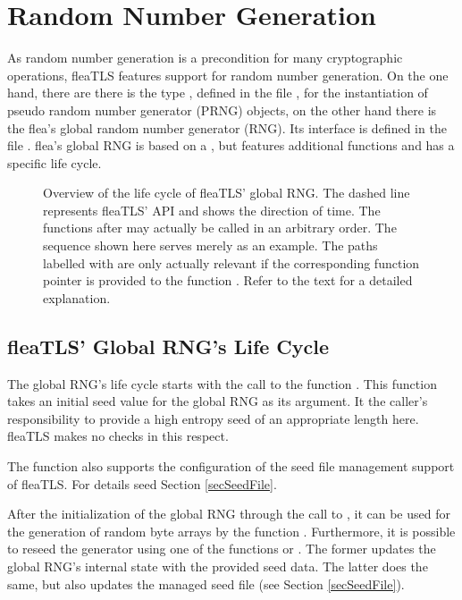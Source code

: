 \documentclass[a4paper,11pt]{scrartcl}
\begin{document}
\section{Random Number Generation }
\label{secRng}

As random number generation is a precondition for many cryptographic operations,
fleaTLS features support for random number generation. On the one hand, there
are there is the type , defined in the file
, for the instantiation of
pseudo random number generator (PRNG) objects, on the other hand there is the flea's
global random number generator (RNG). Its interface is defined in the file
. flea's global RNG is based on a
, but features additional functions and has a
specific life cycle.

\begin{figure}

\label{figRngLifeCycle}
\caption{Overview of the life cycle of fleaTLS' global RNG. The dashed line represents
fleaTLS' API and shows the direction of time. 
The functions after \funcLibInit may actually be called in an arbitrary order.
The sequence shown here serves merely as an example.
The paths labelled
with \funcSaveRngState are only actually relevant if the corresponding function
pointer is provided to the function \funcLibInit. Refer to the text for a
detailed explanation.}
\end{figure}

\subsection{fleaTLS' Global RNG's Life Cycle}
\label{secRngLifeCycle}
The global RNG's life cycle starts with the call to the function
. This function takes an initial seed value for
the global RNG as its argument. It the caller's responsibility to provide a high
entropy seed of an appropriate length here. fleaTLS makes no checks in this
respect. 

The function \funcLibInit also supports the configuration of the seed file
management support of fleaTLS. For details seed Section \ref{secSeedFile}.


After the initialization of the global RNG through the call to
, it can be used for the generation of random
byte arrays by the function . Furthermore,
it is possible to reseed the generator using one of the functions
 or 
. The former updates the global
RNG's internal state with the provided seed data. The latter does the same, but
also updates the managed seed file (see Section \ref{secSeedFile}).
\end{document}
